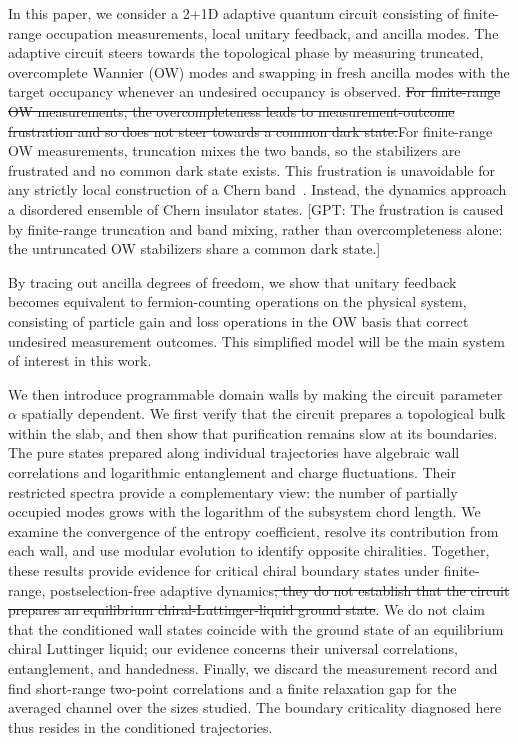 \documentclass[aps,prb,10pt,twocolumn,superscriptaddress,longbibliography,floatfix]{revtex4-2}
\newcommand{\GPT}[1]{{\color{magenta}[GPT: #1]}}
\newcommand{\claudeadd}[1]{{\color{orange}#1}}
\newcommand{\claudedel}[1]{{\color{orange}\sout{#1}}}
\begin{document}
In this paper, we consider a 2+1D adaptive quantum circuit consisting of finite-range occupation measurements, local unitary feedback, and ancilla modes. The adaptive circuit steers towards the topological phase by measuring truncated, overcomplete Wannier (OW) modes and swapping in fresh ancilla modes with the target occupancy whenever an undesired occupancy is observed. \claudedel{For finite-range OW measurements, the overcompleteness leads to measurement-outcome frustration and so does not steer towards a common dark state.}\claudeadd{For finite-range OW measurements, truncation mixes the two bands, so the stabilizers are frustrated and no common dark state exists. This frustration is unavoidable for any strictly local construction of a Chern band~\cite{DubailRead2015}.} Instead, the dynamics approach a disordered ensemble of Chern insulator states.
\GPT{The frustration is caused by finite-range truncation and band mixing, rather than overcompleteness alone: the untruncated OW stabilizers share a common dark state.}
 
By tracing out ancilla degrees of freedom, we show that unitary feedback becomes equivalent to fermion-counting operations on the physical system, consisting of particle gain and loss operations in the OW basis that correct undesired measurement outcomes. This simplified model will be the main system of interest in this work.

{\color{blue}
We then introduce programmable domain walls by making the circuit parameter $\alpha$ spatially dependent. We first verify that the circuit prepares a topological bulk within the slab, and then show that purification remains slow at its boundaries. The pure states prepared along individual trajectories have algebraic wall correlations and logarithmic entanglement and charge fluctuations. Their restricted spectra provide a complementary view: the number of partially occupied modes grows with the logarithm of the subsystem chord length. We examine the convergence of the entropy coefficient, resolve its contribution from each wall, and use modular evolution to identify opposite chiralities. Together, these results provide evidence for critical chiral boundary states under finite-range, postselection-free adaptive dynamics\claudedel{; they do not establish that the circuit prepares an equilibrium chiral-Luttinger-liquid ground state}\claudeadd{. We do not claim that the conditioned wall states coincide with the ground state of an equilibrium chiral Luttinger liquid; our evidence concerns their universal correlations, entanglement, and handedness.} Finally, we discard the measurement record and find short-range two-point correlations and a finite relaxation gap for the averaged channel over the sizes studied. The boundary criticality diagnosed here thus resides in the conditioned trajectories.
}
\end{document}
